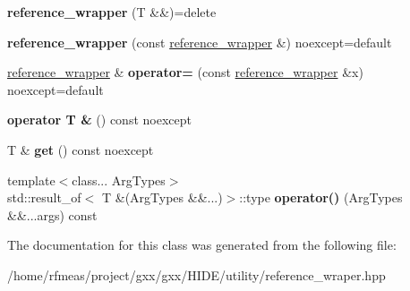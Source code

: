 \begin{DoxyCompactItemize}
\item 
{\bfseries reference\+\_\+wrapper} (T \&\&)=delete\hypertarget{classreference__wrapper_a231d62c5ab9c807133576019a0bc0987}{}\label{classreference__wrapper_a231d62c5ab9c807133576019a0bc0987}

\item 
{\bfseries reference\+\_\+wrapper} (const \hyperlink{classreference__wrapper}{reference\+\_\+wrapper} \&) noexcept=default\hypertarget{classreference__wrapper_a03d768dd684230e4977df453f72a85fd}{}\label{classreference__wrapper_a03d768dd684230e4977df453f72a85fd}

\item 
\hyperlink{classreference__wrapper}{reference\+\_\+wrapper} \& {\bfseries operator=} (const \hyperlink{classreference__wrapper}{reference\+\_\+wrapper} \&x) noexcept=default\hypertarget{classreference__wrapper_ab4fd4bd5b9ca7170c18ddbfaeef2231b}{}\label{classreference__wrapper_ab4fd4bd5b9ca7170c18ddbfaeef2231b}

\item 
{\bfseries operator T \&} () const noexcept\hypertarget{classreference__wrapper_a7cb31b103c769a40a34a43be82763249}{}\label{classreference__wrapper_a7cb31b103c769a40a34a43be82763249}

\item 
T \& {\bfseries get} () const noexcept\hypertarget{classreference__wrapper_ad8c27099d67bb228fcc7f722214bd231}{}\label{classreference__wrapper_ad8c27099d67bb228fcc7f722214bd231}

\item 
{\footnotesize template$<$class... Arg\+Types$>$ }\\std\+::result\+\_\+of$<$ T \&(Arg\+Types \&\&...)$>$\+::type {\bfseries operator()} (Arg\+Types \&\&...args) const \hypertarget{classreference__wrapper_a1ab80280583fa4c2cd19c61d2650bdce}{}\label{classreference__wrapper_a1ab80280583fa4c2cd19c61d2650bdce}

\end{DoxyCompactItemize}


The documentation for this class was generated from the following file\+:\begin{DoxyCompactItemize}
\item 
/home/rfmeas/project/gxx/gxx/\+H\+I\+D\+E/utility/reference\+\_\+wraper.\+hpp\end{DoxyCompactItemize}
